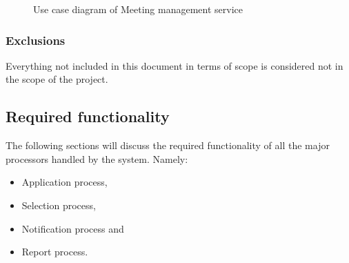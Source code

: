 \documentclass[12pt]{article}
\begin{document}
			\begin{figure}[H]
				\centering				
				\caption{Use case diagram of Meeting management service}
			\end{figure}
		
		\vspace{0.2in}
		\subsubsection{Exclusions}
		\vspace{0.2in}
		Everything not included in this document in terms of scope is considered not in the scope of the project.
		\vspace{0.2in}
		
		\subsection{Required functionality} %
		\vspace{0.2in}
		The following sections will discuss the required functionality of all the major processors handled by the system. Namely:
		\begin{itemize}
			\item Application process,
			\item Selection process,
			\item Notification process and
			\item Report process.
		\end{itemize}
\end{document}
